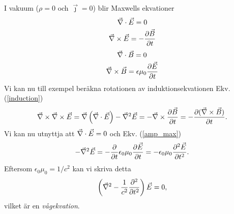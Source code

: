 \documentclass[%
oneside,                 %
final,                   %
10pt]{article}
\begin{document}
\noindent
I vakuum ($\rho=0$ och $\vec{\jmath} = 0$) blir Maxwells ekvationer
\begin{equation}
  \vec{\nabla} \cdot \vec{E} = 0
\end{equation}
\begin{equation}
  \vec{\nabla} \times \vec{E} = - \frac{\partial \vec{B}}{\partial t}
\label{induction}
\end{equation}
\begin{equation}
  \vec{\nabla} \cdot \vec{B} = 0
\end{equation}
\begin{equation}
  \vec{\nabla} \times \vec{B} = \epsilon \mu_0 \frac{\partial \vec{E}}{\partial t}
\label{amp_max}
\end{equation}
Vi kan nu till exempel beräkna rotationen av induktionsekvationen Ekv. (\ref{induction})
\begin{equation}
  \vec{\nabla} \times \vec{\nabla} \times \vec{E} = \vec{\nabla} \left( \vec{\nabla} \cdot \vec{E}
\right) - \vec{\nabla}^2 \vec{E} = - \vec{\nabla} \times 
\frac{\partial \vec{B}}{\partial t} =
- \frac{\partial (\vec{\nabla} \times \vec{B})}{\partial t}.
\end{equation}
Vi kan nu utnyttja att $\vec{\nabla} \cdot \vec{E} =0$ och Ekv. (\ref{amp_max})
\begin{equation}
  - \vec{\nabla}^2 \vec{E} = - \frac{\partial}{\partial t} \epsilon_0 \mu_0
\frac{\partial \vec{E}}{\partial t} = 
- \epsilon_0 \mu_0 \frac{\partial^2 \vec{E}}{\partial t^2}.
\end{equation}
Eftersom $\epsilon_0 \mu_0 = 1/c^2$ kan vi skriva detta
\begin{equation}
  \left( \vec{\nabla}^2 - \frac{1}{c^2} \frac{\partial^2}{\partial t^2} \right) \vec{E} = 0,
\label{vaag}
\end{equation}
vilket är en \emph{vågekvation}. 
\end{document}
